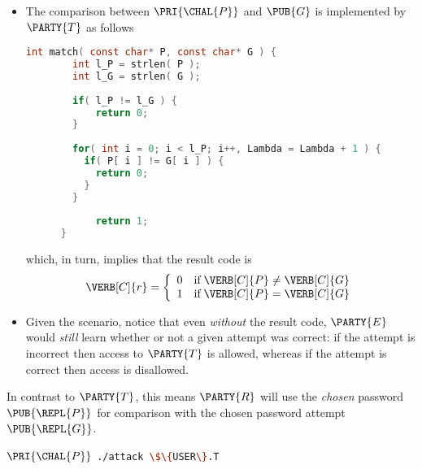 \begin{itemize}
\item The comparison between $\PRI{\CHAL{P}}$ and $\PUB{G}$ is implemented 
      by 
      $\PARTY{T}$ 
      as follows

      \begin{lstlisting}[language={C},gobble={6},frame={single},basicstyle={\ttfamily\small}]
      int match( const char* P, const char* G ) {
        int l_P = strlen( P );
        int l_G = strlen( G );
      
        if( l_P != l_G ) {
            return 0;
        }
      
        for( int i = 0; i < l_P; i++, Lambda = Lambda + 1 ) {
          if( P[ i ] != G[ i ] ) {
            return 0;
          }
        }
      
            return 1;
      }
      \end{lstlisting}

      \noindent
      which, in turn, implies that the result code is
      \[
      \VERB[C]{r} = \left\{\begin{array}{c l@{\;}c@{\;}c@{\;}c}
                           0 & \mbox{if} & \VERB[C]{P} &\neq& \VERB[C]{G} \\
                           1 & \mbox{if} & \VERB[C]{P} &=   & \VERB[C]{G} \\
                           \end{array}
                    \right.
      \]
\item Given the scenario, notice that even {\em without} the result code,
      $\PARTY{E}$ 
      would {\em still} learn whether or not a given attempt was correct: 
      if the attempt is incorrect then access to $\PARTY{T}$ is    allowed,
      whereas
      if the attempt is   correct then access                is disallowed.
\end{itemize}


%
In contrast to 
$\PARTY{T}$, 
this means 
$\PARTY{R}$ 
will use the
{\em chosen} password         $\PUB{\REPL{P}}$
for comparison with the
     chosen  password attempt $\PUB{\REPL{G}}$.



      \DESCTASKIMPL
      {$\PRI{\CHAL{P}}$}
      {\mbox{\lstinline[language={bash}]|./attack \$\{USER\}.T|}}

